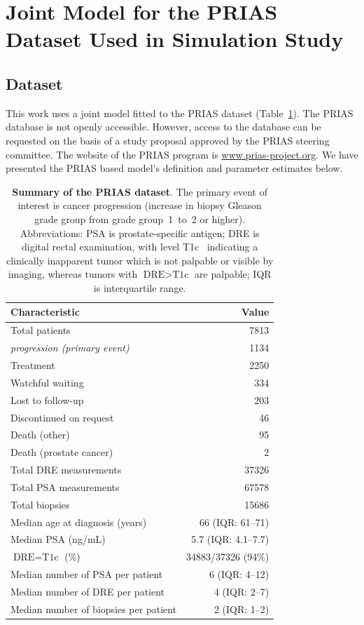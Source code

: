\section{Joint Model for the PRIAS Dataset Used in Simulation Study}
\label{sec:param_estimates_jm_fit_prias}
\subsection{Dataset}
This work uses a joint model fitted to the PRIAS dataset (Table~\ref{table:prias_summary}). The PRIAS database is not openly accessible. However, access to the database can be requested on the basis of a study proposal approved by the PRIAS steering committee. The website of the PRIAS program is \url{www.prias-project.org}. We have presented the PRIAS based model's definition and parameter estimates below.

\begin{table}
\small
\centering
\caption{\textbf{Summary of the PRIAS dataset}. The primary event of interest is cancer progression (increase in biopsy Gleason grade group from grade group~1~to~2 or higher). Abbreviations: PSA is prostate-specific antigen; DRE is digital rectal examination, with level T1c~\citep{schroder1992tnm} indicating a clinically inapparent tumor which is not palpable or visible by imaging, whereas tumors with $\mbox{DRE} > \mbox{T1c}$ are palpable; IQR is interquartile range.}
\label{table:prias_summary}
\begin{tabular}{lr}
\hline
\hline
\textbf{Characteristic} &  \textbf{Value}\\
\hline
Total patients &  7813\\
\textit{progression (primary event)}  & 1134\\
Treatment  &  2250\\
Watchful waiting   & 334\\
Lost to follow-up   & 203\\
Discontinued on request   & 46\\
Death (other)   & 95\\
Death (prostate cancer)   & 2\\
\hline
Total DRE measurements & 37326 \\
Total PSA measurements  & 67578\\
Total biopsies & 15686\\
\hline
Median age at diagnosis (years)   & 66 (IQR: 61--71)\\
Median PSA (ng/mL) & 5.7 (IQR: 4.1--7.7)\\
$\mbox{DRE} = \mbox{T1c}$ (\%)  & 34883/37326 (94\%) \\
\hline
Median number of PSA per patient   &  6 (IQR: 4--12)\\
Median number of DRE per patient & 4 (IQR: 2--7)\\
Median number of biopsies per patient  &  2 (IQR: 1--2)\\
\hline
\end{tabular}
\end{table}

